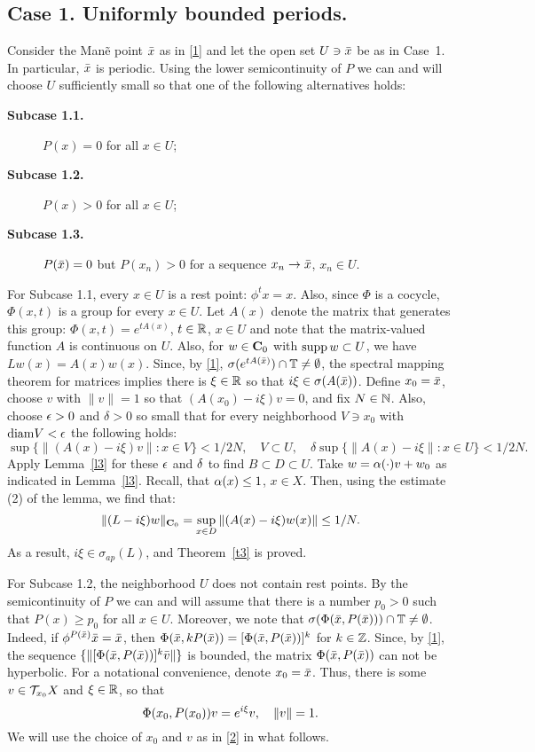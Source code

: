 \subsection{Case 1. Uniformly bounded periods.}
Consider the Man\~e point ${\bar x}$ as in \eqref{1} and  let the
open set $U\ni {\bar x}$ be as in Case~1.  In particular, 
${\bar x}$ is periodic. 
Using the lower semicontinuity of $P$ we can and will choose $U$
sufficiently small so that one of the following 
alternatives holds:
\begin{description}
\item[\bf Subcase 1.1.]$P(x)=0$ for all $x\in U$;
\item[\bf Subcase 1.2.]$P(x)>0$ for all $x\in U$;
\item[\bf Subcase 1.3.]$P({\bar x})=0$ but $P(x_n)>0$
for a sequence $x_n\to {\bar x}$, $x_n\in U$.
\end{description}

For Subcase 1.1, every $x\in U$ is a rest
point: $\phi^tx=x$. Also, since $\Phi$ is a
cocycle, $\Phi(x,t)$ is a group for every $x\in U$. Let $A(x)$
denote the matrix that generates this group: $\Phi(x,t)=e^{tA(x)}$,
$t\in{\Bbb{R}}$, $x\in U$ and note that the matrix-valued function $A$ is
continuous on $U$. Also, for $w\in{{\bold C}_0}$ with $\operatorname{supp} w\subset U$,
we have $Lw(x)=A(x)w(x)$. Since, by \eqref{1},
$\sigma(e^{tA({\bar x})})\cap{\Bbb{T}}\neq\emptyset$,
the spectral mapping theorem
for matrices implies there is $\xi\in{\Bbb{R}}$ so that
$i\xi\in\sigma(A({\bar x}))$. Define $x_0={\bar x}$, choose $v$ with 
$\|v\|=1$ so that $(A(x_0)-i\xi)v=0$, 
and fix $N\in{\Bbb{N}}$. Also, choose $\epsilon>0$ and
$\delta>0$ so small that for every neighborhood $V\ni x_0$
with ${\operatorname{diam}} {V}<\epsilon$
the following holds:
\[\sup\{\|(A(x)-i\xi)v\|: x\in V\} < 1/2N,\quad V\subset U,\quad
\delta\sup\{\|A(x)-i\xi\|: x\in U\}<1/2N.\]
Apply Lemma~\ref{l3} for these $\epsilon$ and $\delta$ 
to find $B\subset D\subset U$.
Take $w=\alpha(\cdot)v+w_0$ as indicated in Lemma~\ref{l3}. Recall, 
that $\alpha(x)\leq 1$, $x\in X$.
Then, using the estimate (2) of the lemma, we find that:
\[\|(L-i\xi)w\|_{{{\bold C}_0}}=\sup_{x\in D}\|(A(x)-i\xi)w(x)\|\leq 1/N.\]
As a result, $i\xi\in\sigma_{{ap}}(L)$, and Theorem~\ref{t3} is
proved.

For Subcase 1.2, the neighborhood $U$ does not contain
rest points. By the semicontinuity of $P$
we can and will assume that there is a number $p_0>0$ such that
$P(x)\geq p_0$ for all $x\in U$. 
Moreover, we note that
$\sigma (\Phi ({\bar x}, P({\bar x}))) \cap {\Bbb{T}} \neq \emptyset$. 
Indeed, if $\phi^{P({\bar x})}{\bar x}={\bar x}$, then 
$\Phi({\bar x},kP({\bar x}))=[\Phi({\bar x},P({\bar x}))]^k$ for $k\in{\Bbb{Z}}$.
Since, by \eqref{1},
the sequence $\{\|[\Phi({\bar x},P({\bar x}))]^k{\bar v}\|\}$ is bounded, the matrix
$\Phi({\bar x},P({\bar x}))$ can not be hyperbolic. For
a notational convenience, denote $x_0={\bar x}$.
Thus, there is some
$v\in {\cal{T}}_{x_0}X$ and $\xi \in{\Bbb{R}}$, so that
\begin{equation}
\Phi (x_0, P(x_0)) v = e^{i\xi} v,\quad \|v\| =1.
\lb{2}
\end{equation}
We will use the choice of $x_0$ and $v$ as in \eqref{2}
in what follows.

